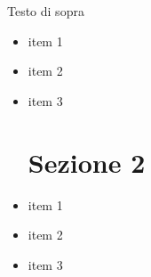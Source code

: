 \documentclass{article}
\begin{document}
	\begin{center}
		\Large Testo di sopra\\ \vspace{0.8em}{\Huge Testo di sotto}
	\end{center}
	\vspace{2em}
    \begin{multicols*}{2}
		\begin{itemize}
  			\setlength\itemsep{-0.1em}
			\section*{Sezione 1}
			\item item 1
			\item item 2
			\item item 3
			\section*{Sezione 2}
			\item item 1
			\item item 2
			\item item 3
		\end{itemize}
    \end{multicols*}
\end{document}
